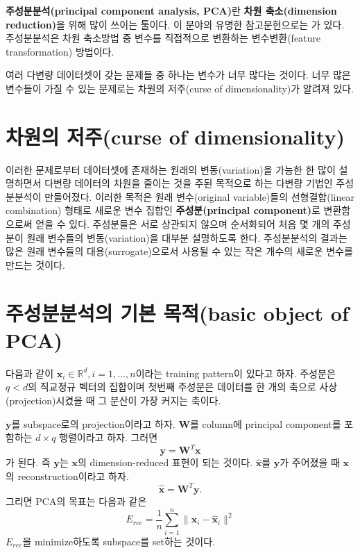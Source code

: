 \documentclass[b5paper,]{scrbook}
\theoremstyle{plain}
\theoremstyle{definition}
\numberwithin{equation}{section}
\begin{document}
\textbf{주성분분석(principal component analysis, PCA)}란 \textbf{차원
축소(dimension reduction)}을 위해 많이 쓰이는 툴이다. 이 분야의 유명한
참고문헌으로는 \citep{Jolliffe2002}가 있다. 주성분분석은 차원 축소방법
중 변수를 직접적으로 변환하는 변수변환(feature transformation) 방법이다.

여러 다변량 데이터셋이 갖는 문제들 중 하나는 변수가 너무 많다는 것이다.
너무 많은 변수들이 가질 수 있는 문제로는 차원의 저주(curse of
dimensionality)가 알려져 있다.

\section{차원의 저주(curse of
dimensionality)}\label{-curse-of-dimensionality}

이러한 문제로부터 데이터셋에 존재하는 원래의 변동(variation)을 가능한 한
많이 설명하면서 다변량 데이터의 차원을 줄이는 것을 주된 목적으로 하는
다변량 기법인 주성분분석이 만들어졌다. 이러한 목적은 원래 변수(original
variable)들의 선형결합(linear combination) 형태로 새로운 변수 집합인
\textbf{주성분(principal component)}로 변환함으로써 얻을 수 있다.
주성분들은 서로 상관되지 않으며 순서화되어 처음 몇 개의 주성분이 원래
변수들의 변동(variation)을 대부분 설명하도록 한다. 주성분분석의 결과는
많은 원래 변수들의 대용(surrogate)으로서 사용될 수 있는 작은 개수의
새로운 변수를 만드는 것이다.

\section{주성분분석의 기본 목적(basic object of
PCA)}\label{--basic-object-of-pca}

다음과 같이 \(\mathbf{x}_{i}\in\mathbb{R}^{d}, i=1,\ldots, n\)이라는
training pattern이 있다고 하자. 주성분은 \(q <d\)의 직교정규 벡터의
집합이며 첫번째 주성분은 데이터를 한 개의 축으로 사상(projection)시켰을
때 그 분산이 가장 커지는 축이다.

\(\mathbf{y}\)를 subspace로의 projection이라고 하자. \(\mathbf{W}\)를
column에 principal component를 포함하는 \(d\times q\) 행렬이라고 하자.
그러면 \[\mathbf{y}=\mathbf{W}^{T}\mathbf{x}\] 가 된다. 즉
\(\mathbf{y}\)는 \(\mathbf{x}\)의 dimension-reduced 표현이 되는 것이다.
\(\hat{\mathbf{x}}\)를 \(\mathbf{y}\)가 주어졌을 때 \(\mathbf{x}\)의
reconstruction이라고 하자.
\[\hat{\mathbf{x}}=\mathbf{W}^{T}\mathbf{y}.\] 그리면 PCA의 목표는
다음과 같은
\[E_{rec}=\frac{1}{n}\sum_{i=1}^{n}\| \mathbf{x}_{i}-\hat{\mathbf{x}}_{i}\|^{2}\]
\(E_{rec}\)을 minimize하도록 subspace를 set하는 것이다.
\end{document}

